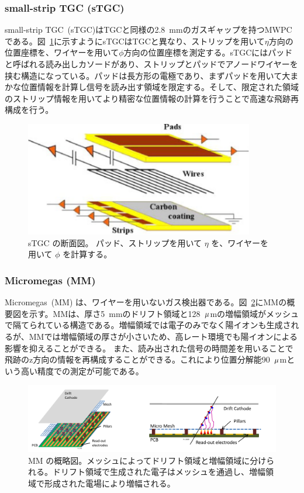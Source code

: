 \subsubsection{small-strip TGC (sTGC)}
small-strip TGC~(sTGC)はTGCと同様の2.8~mmのガスギャップを持つMWPCである。図~\ref{fig:sTGC}に示すようにsTGCはTGCと異なり、ストリップを用いて$\eta$方向の位置座標を、ワイヤーを用いて$\phi$方向の位置座標を測定する。sTGCにはパッドと呼ばれる読み出しカソードがあり、ストリップとパッドでアノードワイヤーを挟む構造になっている。パッドは長方形の電極であり、まずパッドを用いて大まかな位置情報を計算し信号を読み出す領域を限定する。そして、限定された領域のストリップ情報を用いてより精密な位置情報の計算を行うことで高速な飛跡再構成を行う。

\begin{figure}[tb]
  \centering
  \includegraphics[clip, width=10cm]{fig/2/stgc-structure.pdf}
  \caption{sTGC の断面図\cite{article:sTGC}。 パッド、ストリップを用いて $\eta$ を、ワイヤーを用いて $\phi$ を計算する。}
  \label{fig:sTGC}
\end{figure}

\subsubsection{Micromegas (MM)}
Micromegas~(MM) は、ワイヤーを用いないガス検出器である。図~\ref{fig:MM}にMMの概要図を示す。MMは、厚さ5~mmのドリフト領域と128~$\rm{\mu}$mの増幅領域がメッシュで隔てられている構造である。増幅領域では電子のみでなく陽イオンも生成されるが、MMでは増幅領域の厚さが小さいため、高レート環境でも陽イオンによる影響を抑えることができる。
また、読み出された信号の時間差を用いることで飛跡のz方向の情報を再構成することができる。これにより位置分解能90~$\rm{\mu}$mという高い精度での測定が可能である。

\begin{figure}[tb]
  \centering
  \includegraphics[clip, width=13cm]{fig/2/mm-structure.pdf}
  \caption{MM の概略図\cite{article:sTGC}。メッシュによってドリフト領域と増幅領域に分けられる。ドリフト領域で生成された電子はメッシュを通過し、増幅領域で形成された電場により増幅される。}
  \label{fig:MM}
\end{figure}



